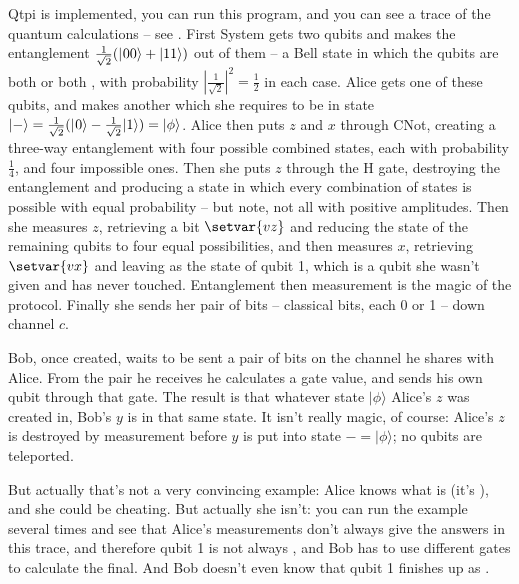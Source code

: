 \documentclass[11pt,a4paper]{article}
\begin{document}
Qtpi is implemented, you can run this program, and you can see a trace of the quantum calculations -- see . First System gets two qubits and makes the entanglement $\frac{1}{\sqrt{2}}(|\hspace{0.5pt}00\rangle+|11\rangle)$ out of them -- a Bell state in which the qubits are both \zero{} or both \one{}, with probability $|\frac{1}{\sqrt{2}}|^{2} = \frac{1}{2}$ in each case. Alice gets one of these qubits, and makes another which she requires to be in state $\minus = \frac{1}{\sqrt{2}}(\zero-\frac{1}{\sqrt{2}}\one) = \bv{\phi}$. Alice then puts $z$ and $x$ through CNot, creating a three-way entanglement with four possible combined states, each with probability $\frac{1}{4}$, and four impossible ones. Then she puts $z$ through the H gate, destroying the entanglement and producing a state in which every combination of states is possible with equal probability -- but note, not all with positive amplitudes. Then she measures $z$, retrieving a bit $\setvar{vz}$ and reducing the state of the remaining qubits to four equal possibilities, and then measures $x$, retrieving $\setvar{vx}$ and leaving \plus as the state of qubit 1, which is a qubit she wasn't given and has never touched. Entanglement then measurement is the magic of the protocol. Finally she sends her pair of bits -- classical bits, each 0 or 1 -- down channel $c$.

Bob, once created, waits to be sent a pair of bits on the channel he shares with Alice. From the pair he receives he calculates a gate value, and sends his own qubit through that gate. The result is that whatever state $|\phi\rangle$ Alice's $z$ was created in, Bob's $y$ is in that same state. It isn't really magic, of course: Alice's $z$ is destroyed by measurement before $y$ is put into state $\minus=|\phi\rangle$; no qubits are teleported. 

But actually that's not a very convincing example: Alice knows what \bv{\phi} is (it's \minus), and she could be cheating. But actually she isn't: you can run the example several times and see that Alice's measurements don't always give the answers in this trace, and therefore qubit 1 is not always \plus, and Bob has to use different gates to calculate the final. And Bob doesn't even know that qubit 1 finishes up as \minus.
\end{document}
